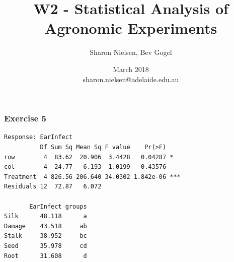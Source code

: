 
%
%



\usepackage{hyperref}
\usepackage{multirow}
\usepackage{graphics}
\usepackage{epsfig}
\usepackage{verbatim}
\usepackage{fancyvrb}
\usepackage{shortvrb}
\usepackage{moreverb}
\usepackage[dvips]{rotating}
\usepackage{pifont}
\usepackage{tikz}
\usepackage{apacite}
\usepackage{booktabs}
\newcommand{\head}[1]{\textnormal{\textbf{#1}}}


\usepackage{setspace}
\usepackage{graphicx}
\usepackage{amsmath}
\usepackage{multicol}
\usepackage{wasysym}
\usepackage{colortbl}


\usepackage[light]{iwona}
\usepackage[T1]{fontenc}

\usepackage{listings}%
\lstset{
  basicstyle=\ttfamily,
  mathescape
}




\title[W1 - Analysis]{W2 - Statistical Analysis of Agronomic Experiments}
\author{Sharon Nielsen, Bev Gogel}
\date{March 2018 \\ \vspace{0.2cm}\footnotesize  sharon.nielsen@adelaide.edu.au}







\begin{frame}[fragile]\frametitle{Exercise 5}
\begin{verbatim}
Response: EarInfect
          Df Sum Sq Mean Sq F value    Pr(>F)
row        4  83.62  20.906  3.4428   0.04287 *
col        4  24.77   6.193  1.0199   0.43576
Treatment  4 826.56 206.640 34.0302 1.842e-06 ***
Residuals 12  72.87   6.072

       EarInfect groups
Silk      48.118      a
Damage    43.518     ab
Stalk     38.952     bc
Seed      35.978     cd
Root      31.608      d
\end{verbatim}
\end{frame}

